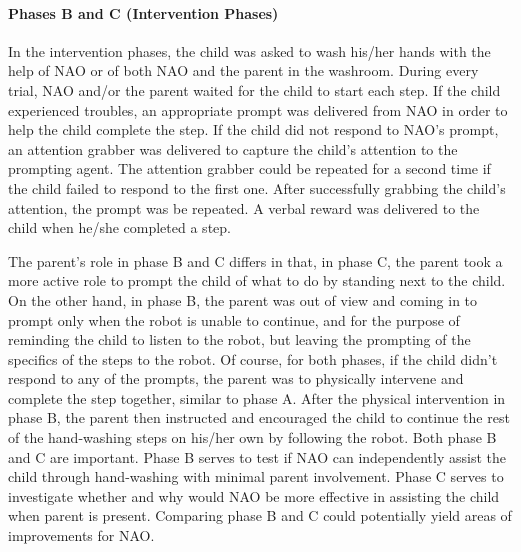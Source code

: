 \paragraph{Phases B and C (Intervention Phases)}
In the intervention phases, the child was asked to wash his/her hands with the help of NAO or of both NAO and the parent in the washroom. During every trial, NAO and/or the parent waited for the child to start each step. If the child experienced troubles, an appropriate prompt was delivered from NAO in order to help the child complete the step. If the child did not respond to NAO's prompt, an attention grabber was delivered to capture the child's attention to the prompting agent. The attention grabber could be repeated for a second time if the child failed to respond to the first one.  After successfully grabbing the child's attention, the prompt was be repeated.  A verbal reward was delivered to the child when he/she completed a step.

The parent's role in phase B and C differs in that, in phase C, the parent took a more active role to prompt the child of what to do by standing next to the child.  On the other hand, in phase B, the parent was out of view and coming in to prompt only when the robot is unable to continue, and for the purpose of reminding the child to listen to the robot, but leaving the prompting of the specifics of the steps to the robot.  Of course, for both phases, if the child didn't respond to any of the prompts, the parent was to physically intervene and complete the step together, similar to phase A.  After the physical intervention in phase B, the parent then instructed and encouraged the child to continue the rest of the hand-washing steps on his/her own by following the robot.  Both phase B and C are important.  Phase B serves to test if NAO can independently assist the child through hand-washing with minimal parent involvement.  Phase C serves to investigate whether and why would NAO be more effective in assisting the child when parent is present.  Comparing phase B and C could potentially yield areas of improvements for NAO.

